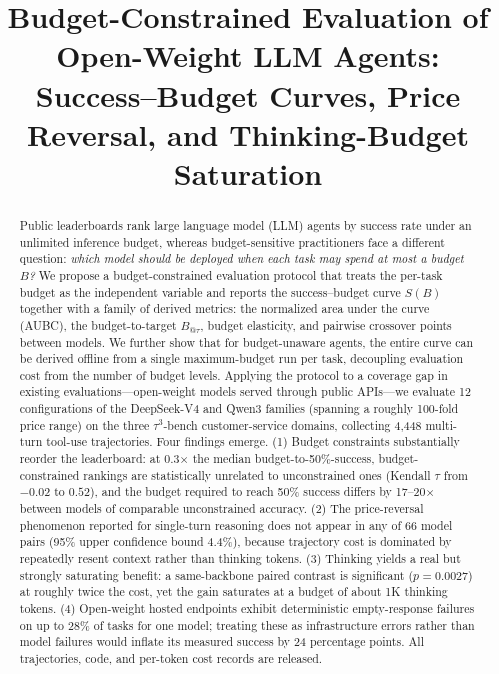 \documentclass[preprint,authoryear,12pt]{elsarticle}
\begin{document}
\begin{frontmatter}

\title{Budget-Constrained Evaluation of Open-Weight LLM Agents: Success--Budget Curves, Price Reversal, and Thinking-Budget Saturation}

\author{}

\begin{abstract}
Public leaderboards rank large language model (LLM) agents by success rate under an unlimited inference budget, whereas budget-sensitive practitioners face a different question: \emph{which model should be deployed when each task may spend at most a budget $B$?} We propose a budget-constrained evaluation protocol that treats the per-task budget as the independent variable and reports the success--budget curve $S(B)$ together with a family of derived metrics: the normalized area under the curve (AUBC), the budget-to-target $B_{@\tau}$, budget elasticity, and pairwise crossover points between models. We further show that for budget-unaware agents, the entire curve can be derived offline from a single maximum-budget run per task, decoupling evaluation cost from the number of budget levels. Applying the protocol to a coverage gap in existing evaluations---open-weight models served through public APIs---we evaluate 12 configurations of the DeepSeek-V4 and Qwen3 families (spanning a roughly 100-fold price range) on the three $\tau^3$-bench customer-service domains, collecting 4,448 multi-turn tool-use trajectories. Four findings emerge. (1) Budget constraints substantially reorder the leaderboard: at 0.3$\times$ the median budget-to-50\%-success, budget-constrained rankings are statistically unrelated to unconstrained ones (Kendall $\tau$ from $-0.02$ to $0.52$), and the budget required to reach 50\% success differs by 17--20$\times$ between models of comparable unconstrained accuracy. (2) The price-reversal phenomenon reported for single-turn reasoning does not appear in any of 66 model pairs (95\% upper confidence bound 4.4\%), because trajectory cost is dominated by repeatedly resent context rather than thinking tokens. (3) Thinking yields a real but strongly saturating benefit: a same-backbone paired contrast is significant ($p=0.0027$) at roughly twice the cost, yet the gain saturates at a budget of about 1K thinking tokens. (4) Open-weight hosted endpoints exhibit deterministic empty-response failures on up to 28\% of tasks for one model; treating these as infrastructure errors rather than model failures would inflate its measured success by 24 percentage points. All trajectories, code, and per-token cost records are released.
\end{abstract}


\end{frontmatter}
\end{document}
